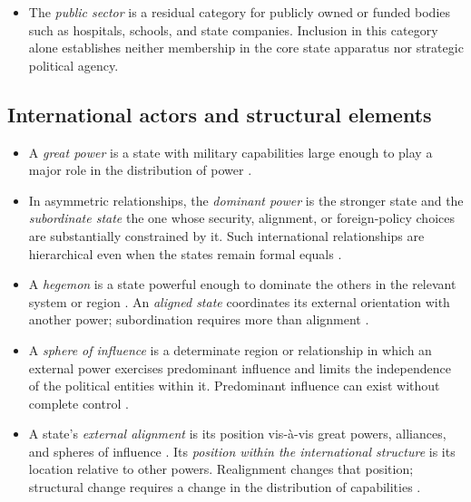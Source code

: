 \documentclass[11pt]{article}
\begin{document}
\begin{itemize}
	\begin{itemize}
		\item the \emph{coercive apparatus} (armed forces, police, security services; \textcite{tilly_1990,althusser_1971}),
		\item the \emph{administrative apparatus} (ministries and public bureaucracy; \textcite{weber1922wirtschaft}), and
		\item the \emph{judicial apparatus} (courts and related institutions; \textcite{weber1922wirtschaft,garciatrevijano2010}).
	\end{itemize}
	\item The \emph{public sector} is a residual category for publicly owned or funded bodies such as hospitals, schools, and state companies. Inclusion in this category alone establishes neither membership in the core state apparatus nor strategic political agency.
\end{itemize}

\subsection{International actors and structural elements}

\begin{itemize}
	\item A \emph{great power} is a state with military capabilities large enough to play a major role in the distribution of power \parencite{mearsheimer_2001}.
	\item In asymmetric relationships, the \emph{dominant power} is the stronger state and the \emph{subordinate state} the one whose security, alignment, or foreign-policy choices are substantially constrained by it. Such international relationships are hierarchical even when the states remain formal equals \parencite{lake_2009}.
	\item A \emph{hegemon} is a state powerful enough to dominate the others in the relevant system or region \parencite{mearsheimer_2001}. An \emph{aligned state} coordinates its external orientation with another power; subordination requires more than alignment \parencite{walt_1987}.
	\item A \emph{sphere of influence} is a determinate region or relationship in which an external power exercises predominant influence and limits the independence of the political entities within it. Predominant influence can exist without complete control \parencite{keal_1983,hast_2014}.
	\item A state's \emph{external alignment} is its position vis-\`a-vis great powers, alliances, and spheres of influence \parencite{walt_1987}. Its \emph{position within the international structure} is its location relative to other powers. Realignment changes that position; structural change requires a change in the distribution of capabilities \parencite{waltz_1979}.
\end{itemize}
\end{document}
